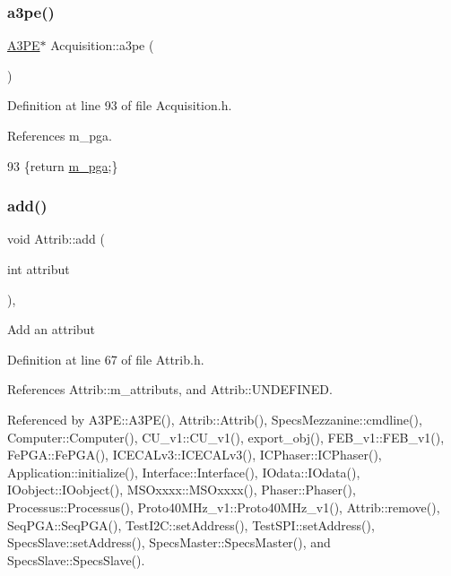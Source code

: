 \subsubsection{\texorpdfstring{a3pe()}{a3pe()}}
{\footnotesize\ttfamily \hyperlink{classA3PE}{A3\+PE}$\ast$ Acquisition\+::a3pe (\begin{DoxyParamCaption}{ }\end{DoxyParamCaption})\hspace{0.3cm}{\ttfamily [inline]}}



Definition at line 93 of file Acquisition.\+h.



References m\+\_\+pga.


\begin{DoxyCode}
93 \{\textcolor{keywordflow}{return} \hyperlink{classAcquisition_aac113fd42c6574cdb4154e9808a21b67}{m\_pga};\}
\end{DoxyCode}
\mbox{\label{classAttrib_a235f773af19c900264a190b00a3b4ad7}} 
\subsubsection{\texorpdfstring{add()}{add()}}
{\footnotesize\ttfamily void Attrib\+::add (\begin{DoxyParamCaption}\item[{int}]{attribut }\end{DoxyParamCaption})\hspace{0.3cm}{\ttfamily [inline]}, {\ttfamily [inherited]}}

Add an attribut 

Definition at line 67 of file Attrib.\+h.



References Attrib\+::m\+\_\+attributs, and Attrib\+::\+U\+N\+D\+E\+F\+I\+N\+ED.



Referenced by A3\+P\+E\+::\+A3\+P\+E(), Attrib\+::\+Attrib(), Specs\+Mezzanine\+::cmdline(), Computer\+::\+Computer(), C\+U\+\_\+v1\+::\+C\+U\+\_\+v1(), export\+\_\+obj(), F\+E\+B\+\_\+v1\+::\+F\+E\+B\+\_\+v1(), Fe\+P\+G\+A\+::\+Fe\+P\+G\+A(), I\+C\+E\+C\+A\+Lv3\+::\+I\+C\+E\+C\+A\+Lv3(), I\+C\+Phaser\+::\+I\+C\+Phaser(), Application\+::initialize(), Interface\+::\+Interface(), I\+Odata\+::\+I\+Odata(), I\+Oobject\+::\+I\+Oobject(), M\+S\+Oxxxx\+::\+M\+S\+Oxxxx(), Phaser\+::\+Phaser(), Processus\+::\+Processus(), Proto40\+M\+Hz\+\_\+v1\+::\+Proto40\+M\+Hz\+\_\+v1(), Attrib\+::remove(), Seq\+P\+G\+A\+::\+Seq\+P\+G\+A(), Test\+I2\+C\+::set\+Address(), Test\+S\+P\+I\+::set\+Address(), Specs\+Slave\+::set\+Address(), Specs\+Master\+::\+Specs\+Master(), and Specs\+Slave\+::\+Specs\+Slave().


